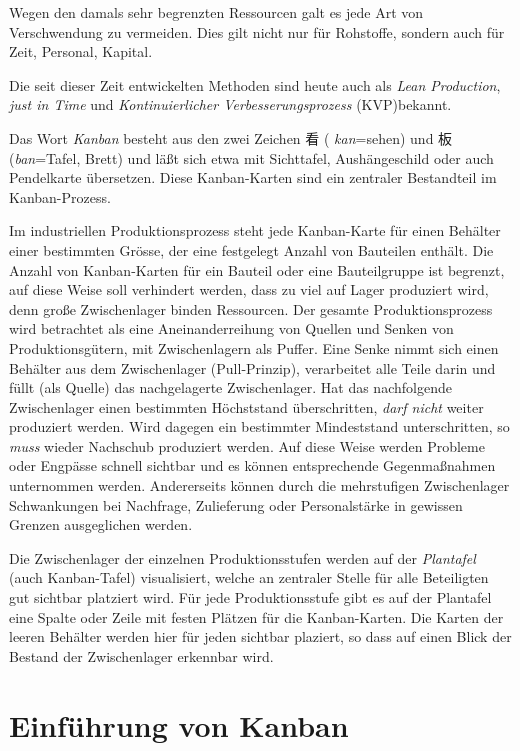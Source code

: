 Wegen den damals sehr begrenzten Ressourcen galt es jede Art von Verschwendung 
zu vermeiden. Dies gilt nicht nur für Rohstoffe, sondern auch für Zeit, 
Personal, Kapital.

Die seit dieser Zeit entwickelten Methoden sind heute auch als 
\emph{Lean Production}, \emph{just in Time} und 
\emph{Kontinuierlicher Verbesserungsprozess} (KVP)bekannt.

Das Wort \emph{Kanban} besteht aus den zwei Zeichen {\CN 看} ( \emph{kan}=sehen)
 und {\CN 板} (\emph{ban}=Tafel, Brett) und läßt sich etwa mit Sichttafel, 
 Aushängeschild oder auch Pendelkarte übersetzen.
Diese Kanban-Karten sind ein zentraler Bestandteil im Kanban-Prozess.

Im industriellen Produktionsprozess steht jede Kanban-Karte für einen Behälter einer bestimmten Grösse, der eine festgelegt Anzahl von Bauteilen enthält.
Die Anzahl von Kanban-Karten für ein Bauteil oder eine Bauteilgruppe ist begrenzt, auf diese Weise soll verhindert werden, dass zu viel auf Lager produziert wird, denn große Zwischenlager binden Ressourcen.
Der gesamte Produktionsprozess wird betrachtet als eine Aneinanderreihung von Quellen und Senken von Produktionsgütern, mit Zwischenlagern als Puffer.
Eine Senke nimmt sich einen Behälter aus dem Zwischenlager (Pull-Prinzip), verarbeitet alle Teile darin und füllt (als Quelle) das nachgelagerte Zwischenlager.
Hat das nachfolgende Zwischenlager einen bestimmten Höchststand überschritten, \emph{darf nicht} weiter produziert werden.
Wird dagegen ein bestimmter Mindeststand unterschritten, so \emph{muss} wieder Nachschub produziert werden.
Auf diese Weise werden Probleme oder Engpässe schnell sichtbar und es können entsprechende Gegenmaßnahmen unternommen werden.
Andererseits können durch die mehrstufigen Zwischenlager Schwankungen bei Nachfrage, Zulieferung oder Personalstärke in gewissen Grenzen ausgeglichen werden.

Die Zwischenlager der einzelnen Produktionsstufen werden auf der \emph{Plantafel} (auch Kanban-Tafel) visualisiert, welche an zentraler Stelle für alle Beteiligten gut sichtbar platziert wird.
Für jede Produktionsstufe gibt es auf der Plantafel eine Spalte oder Zeile mit festen Plätzen für die Kanban-Karten.
Die Karten der leeren Behälter werden hier für jeden sichtbar plaziert, so dass auf einen Blick der Bestand der Zwischenlager erkennbar wird.


\section{Einführung von Kanban}
